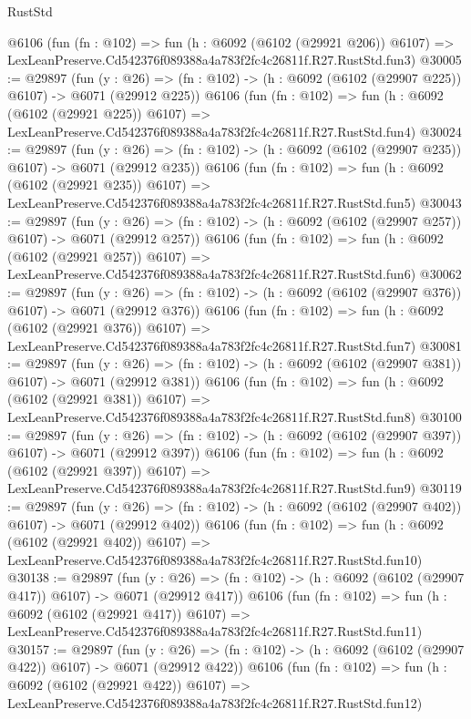 \begin{lexlean}{RustStd}
\begin{coremodule}
    @6106
    (fun (fn : @102) =>
    fun (h : @6092 (@6102 (@29921 @206)) @6107) =>
    LexLeanPreserve.Cd542376f089388a4a783f2fc4c26811f.R27.RustStd.fun3)
@30005 := @29897
    (fun (y : @26) => (fn : @102) -> (h : @6092 (@6102 (@29907 @225)) @6107) -> @6071 (@29912 @225))
    @6106
    (fun (fn : @102) =>
    fun (h : @6092 (@6102 (@29921 @225)) @6107) =>
    LexLeanPreserve.Cd542376f089388a4a783f2fc4c26811f.R27.RustStd.fun4)
@30024 := @29897
    (fun (y : @26) => (fn : @102) -> (h : @6092 (@6102 (@29907 @235)) @6107) -> @6071 (@29912 @235))
    @6106
    (fun (fn : @102) =>
    fun (h : @6092 (@6102 (@29921 @235)) @6107) =>
    LexLeanPreserve.Cd542376f089388a4a783f2fc4c26811f.R27.RustStd.fun5)
@30043 := @29897
    (fun (y : @26) => (fn : @102) -> (h : @6092 (@6102 (@29907 @257)) @6107) -> @6071 (@29912 @257))
    @6106
    (fun (fn : @102) =>
    fun (h : @6092 (@6102 (@29921 @257)) @6107) =>
    LexLeanPreserve.Cd542376f089388a4a783f2fc4c26811f.R27.RustStd.fun6)
@30062 := @29897
    (fun (y : @26) => (fn : @102) -> (h : @6092 (@6102 (@29907 @376)) @6107) -> @6071 (@29912 @376))
    @6106
    (fun (fn : @102) =>
    fun (h : @6092 (@6102 (@29921 @376)) @6107) =>
    LexLeanPreserve.Cd542376f089388a4a783f2fc4c26811f.R27.RustStd.fun7)
@30081 := @29897
    (fun (y : @26) => (fn : @102) -> (h : @6092 (@6102 (@29907 @381)) @6107) -> @6071 (@29912 @381))
    @6106
    (fun (fn : @102) =>
    fun (h : @6092 (@6102 (@29921 @381)) @6107) =>
    LexLeanPreserve.Cd542376f089388a4a783f2fc4c26811f.R27.RustStd.fun8)
@30100 := @29897
    (fun (y : @26) => (fn : @102) -> (h : @6092 (@6102 (@29907 @397)) @6107) -> @6071 (@29912 @397))
    @6106
    (fun (fn : @102) =>
    fun (h : @6092 (@6102 (@29921 @397)) @6107) =>
    LexLeanPreserve.Cd542376f089388a4a783f2fc4c26811f.R27.RustStd.fun9)
@30119 := @29897
    (fun (y : @26) => (fn : @102) -> (h : @6092 (@6102 (@29907 @402)) @6107) -> @6071 (@29912 @402))
    @6106
    (fun (fn : @102) =>
    fun (h : @6092 (@6102 (@29921 @402)) @6107) =>
    LexLeanPreserve.Cd542376f089388a4a783f2fc4c26811f.R27.RustStd.fun10)
@30138 := @29897
    (fun (y : @26) => (fn : @102) -> (h : @6092 (@6102 (@29907 @417)) @6107) -> @6071 (@29912 @417))
    @6106
    (fun (fn : @102) =>
    fun (h : @6092 (@6102 (@29921 @417)) @6107) =>
    LexLeanPreserve.Cd542376f089388a4a783f2fc4c26811f.R27.RustStd.fun11)
@30157 := @29897
    (fun (y : @26) => (fn : @102) -> (h : @6092 (@6102 (@29907 @422)) @6107) -> @6071 (@29912 @422))
    @6106
    (fun (fn : @102) =>
    fun (h : @6092 (@6102 (@29921 @422)) @6107) =>
    LexLeanPreserve.Cd542376f089388a4a783f2fc4c26811f.R27.RustStd.fun12)

\end{coremodule}
\end{lexlean}
